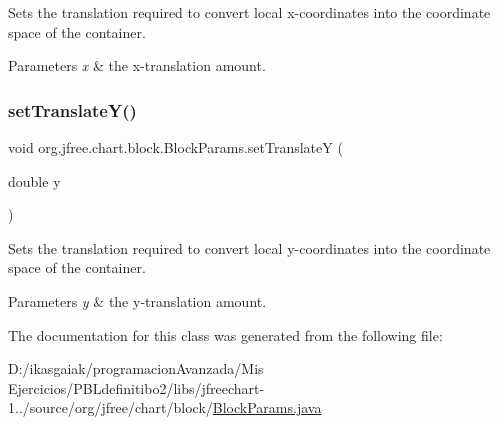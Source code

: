 Sets the translation required to convert local x-\/coordinates into the coordinate space of the container.


\begin{DoxyParams}{Parameters}
{\em x} & the x-\/translation amount. \\
\hline
\end{DoxyParams}
\mbox{\label{classorg_1_1jfree_1_1chart_1_1block_1_1_block_params_a0b256b84430909bc2643998c54e4a0ad}} 
\subsubsection{\texorpdfstring{set\+Translate\+Y()}{setTranslateY()}}
{\footnotesize\ttfamily void org.\+jfree.\+chart.\+block.\+Block\+Params.\+set\+TranslateY (\begin{DoxyParamCaption}\item[{double}]{y }\end{DoxyParamCaption})}

Sets the translation required to convert local y-\/coordinates into the coordinate space of the container.


\begin{DoxyParams}{Parameters}
{\em y} & the y-\/translation amount. \\
\hline
\end{DoxyParams}


The documentation for this class was generated from the following file\+:\begin{DoxyCompactItemize}
\item 
D\+:/ikasgaiak/programacion\+Avanzada/\+Mis Ejercicios/\+P\+B\+Ldefinitibo2/libs/jfreechart-\/1../source/org/jfree/chart/block/\mbox{\hyperlink{_block_params_8java}{Block\+Params.\+java}}\end{DoxyCompactItemize}
